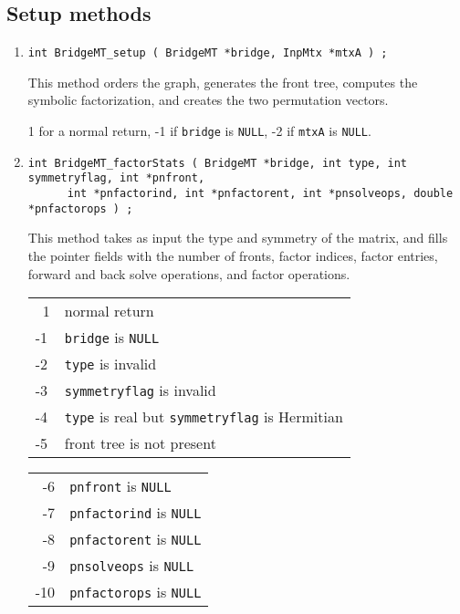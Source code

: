\subsection{Setup methods}
\label{subsection:BridgeMT:proto:setup}
\par
\begin{enumerate}
\item
\begin{verbatim}
int BridgeMT_setup ( BridgeMT *bridge, InpMtx *mtxA ) ;
\end{verbatim}
This method orders the graph, generates the front tree, computes
the symbolic factorization, and creates the two permutation vectors.
\par {}
1 for a  normal return,
-1 if \texttt{bridge} is \texttt{NULL},
-2 if \texttt{mtxA} is \texttt{NULL}.
\item
\begin{verbatim}
int BridgeMT_factorStats ( BridgeMT *bridge, int type, int symmetryflag, int *pnfront,
      int *pnfactorind, int *pnfactorent, int *pnsolveops, double *pnfactorops ) ;
\end{verbatim}
This method takes as input the type and symmetry of the matrix,
and fills the pointer fields with the number of fronts, factor
indices, factor entries, forward and back solve operations,
and factor operations.
\par {}
\begin{center}
\begin{tabular}{ll}
~1 & normal return \\
-1 & \texttt{bridge} is \texttt{NULL} \\
-2 & \texttt{type} is invalid \\
-3 & \texttt{symmetryflag} is invalid \\
-4 & \texttt{type} is real but \texttt{symmetryflag} is Hermitian \\
-5 & front tree is not present
\end{tabular}
\begin{tabular}{ll}
~-6 & \texttt{pnfront} is \texttt{NULL}  \\
~-7 & \texttt{pnfactorind} is \texttt{NULL}  \\
~-8 & \texttt{pnfactorent} is \texttt{NULL}  \\
~-9 & \texttt{pnsolveops} is \texttt{NULL}  \\
-10 & \texttt{pnfactorops} is \texttt{NULL} 
\end{tabular}
\end{center}
\end{enumerate}
\par
